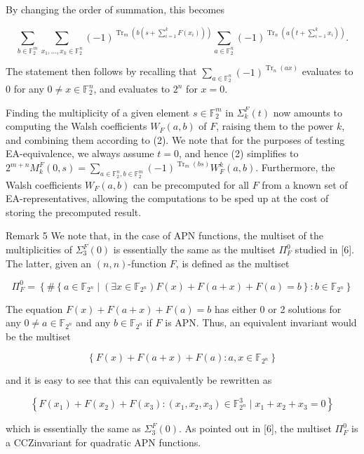 \documentclass[10pt]{article}
\begin{document}
By changing the order of summation, this becomes

$$
\sum_{b \in \mathbb{F}_{2}^{m}} \sum_{x_{1}, \ldots, x_{k} \in \mathbb{F}_{2}^{n}}(-1)^{\operatorname{Tr}_{m}\left(b\left(s+\sum_{i=1}^{k} F\left(x_{i}\right)\right)\right)} \sum_{a \in \mathbb{F}_{2}^{n}}(-1)^{\operatorname{Tr}_{n}\left(a\left(t+\sum_{i=1}^{k} x_{i}\right)\right)} .
$$

The statement then follows by recalling that $\sum_{a \in \mathbb{F}_{2}^{n}}(-1)^{\operatorname{Tr}_{n}(a x)}$ evaluates to 0 for any $0 \neq x \in \mathbb{F}_{2}^{n}$, and evaluates to $2^{n}$ for $x=0$.

Finding the multiplicity of a given element $s \in \mathbb{F}_{2}^{m}$ in $\Sigma_{k}^{F}(t)$ now amounts to computing the Walsh coefficients $W_{F}(a, b)$ of $F$, raising them to the power $k$, and combining them according to (2). We note that for the purposes of testing EA-equivalence, we always assume $t=0$, and hence (2) simplifies to $2^{m+n} M_{k}^{F}(0, s)=\sum_{a \in \mathbb{F}_{2}^{n}, b \in \mathbb{F}_{2}^{m}}(-1)^{\operatorname{Tr}_{m}(b s)} W_{F}^{k}(a, b)$. Furthermore, the Walsh coefficients $W_{F}(a, b)$ can be precomputed for all $F$ from a known set of EA-representatives, allowing the computations to be sped up at the cost of storing the precomputed result.

Remark 5 We note that, in the case of APN functions, the multiset of the multiplicities of $\Sigma_{3}^{F}(0)$ is essentially the same as the multiset $\Pi_{F}^{0}$ studied in [6]. The latter, given an $(n, n)$-function $F$, is defined as the multiset

$$
\Pi_{F}^{0}=\left\{\#\left\{a \in \mathbb{F}_{2^{n}} \mid\left(\exists x \in \mathbb{F}_{2^{n}}\right) F(x)+F(a+x)+F(a)=b\right\}: b \in \mathbb{F}_{2^{n}}\right\}
$$

The equation $F(x)+F(a+x)+F(a)=b$ has either 0 or 2 solutions for any $0 \neq a \in \mathbb{F}_{2^{n}}$ and any $b \in \mathbb{F}_{2^{n}}$ if $F$ is APN. Thus, an equivalent invariant would be the multiset

$$
\left\{F(x)+F(a+x)+F(a): a, x \in \mathbb{F}_{2^{n}}\right\}
$$

and it is easy to see that this can equivalently be rewritten as

$$
\left\{F\left(x_{1}\right)+F\left(x_{2}\right)+F\left(x_{3}\right):\left(x_{1}, x_{2}, x_{3}\right) \in \mathbb{F}_{2^{n}}^{3} \mid x_{1}+x_{2}+x_{3}=0\right\}
$$

which is essentially the same as $\Sigma_{3}^{F}(0)$. As pointed out in [6], the multiset $\Pi_{F}^{0}$ is a CCZinvariant for quadratic APN functions.
\end{document}
